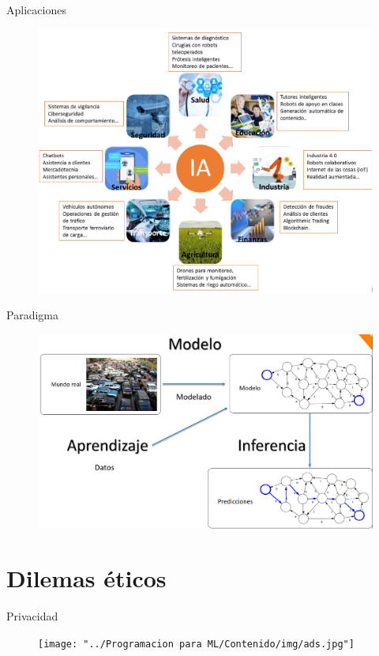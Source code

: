 \documentclass[11pt,aspectratio=169]{beamer}
\begin{document}
\begin{frame}{Aplicaciones}
    \begin{figure}
        \centering
        \includegraphics[scale=0.35]{img/aplicacionesIA.png}
    \end{figure}
\end{frame}

\begin{frame}{Paradigma}
    \begin{figure}
        \centering 
        \includegraphics[scale=0.25]{img/paradigma.png}
    \end{figure}
\end{frame}


\section[Ética]{Dilemas éticos}
\begin{frame}{Privacidad}
    \begin{figure}
        \centering
        \texttt{[image: "../Programacion para ML/Contenido/img/ads.jpg"]}
    \end{figure}
\end{frame}
\end{document}
